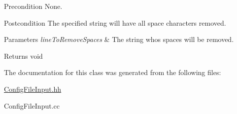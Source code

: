 \begin{DoxyPrecond}{Precondition}
None. 
\end{DoxyPrecond}
\begin{DoxyPostcond}{Postcondition}
The specified string will have all space characters removed. 
\end{DoxyPostcond}

\begin{DoxyParams}{Parameters}
{\em line\+To\+Remove\+Spaces} & The string who\textquotesingle{}s spaces will be removed. \\
\hline
\end{DoxyParams}
\begin{DoxyReturn}{Returns}
void 
\end{DoxyReturn}


The documentation for this class was generated from the following files\+:\begin{DoxyCompactItemize}
\item 
\hyperlink{_config_file_input_8hh}{Config\+File\+Input.\+hh}\item 
Config\+File\+Input.\+cc\end{DoxyCompactItemize}
